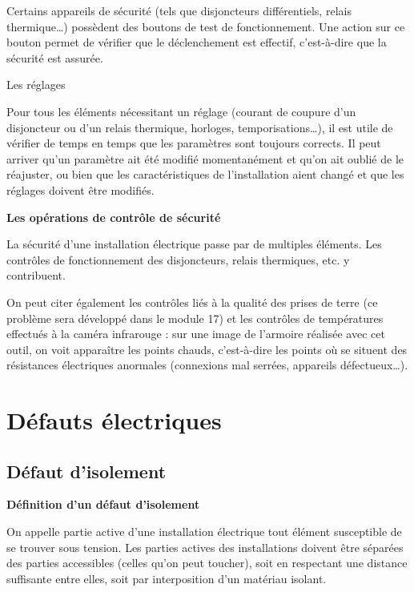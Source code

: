Certains appareils de sécurité (tels que disjoncteurs différentiels, relais thermique…) possèdent des boutons de test de fonctionnement. Une action sur ce bouton permet de vérifier que le déclenchement est effectif, c’est-à-dire que la sécurité est assurée.

\vspace{0.3cm}
Les réglages
\vspace{0.3cm}

Pour tous les éléments nécessitant un réglage (courant de coupure d’un disjoncteur ou d’un relais thermique, horloges, temporisations…), il est utile de vérifier de temps en temps que les paramètres sont toujours corrects. Il peut arriver qu’un paramètre ait été modifié momentanément et qu’on ait oublié de le réajuster, ou bien que les caractéristiques de l’installation aient changé et que les réglages doivent être modifiés.


\vspace{0.3cm}
\textbf{Les opérations de contrôle de sécurité}
\vspace{0.3cm} 

La sécurité d’une installation électrique passe par de multiples éléments. Les contrôles de fonctionnement des disjoncteurs, relais thermiques, etc. y contribuent.
\vspace{0.3cm}

On peut citer également les contrôles liés à la qualité des prises de terre (ce problème sera développé dans le module 17) et les contrôles de températures effectués à la caméra infrarouge : sur une image de l’armoire réalisée avec cet outil, on voit apparaître les points chauds, c’est-à-dire les points où se situent des résistances électriques anormales (connexions mal serrées, appareils défectueux…).


\section{Défauts électriques}


\subsection{Défaut d'isolement}

\vspace{0.3cm}
\textbf{Définition d'un défaut d'isolement}
\vspace{0.3cm}

On appelle partie active d’une installation électrique tout élément susceptible de se trouver sous tension. Les parties actives des installations doivent être séparées des parties accessibles (celles qu’on peut toucher), soit en respectant une distance suffisante entre elles, soit par interposition d’un matériau isolant.
\vspace{0.3cm}

